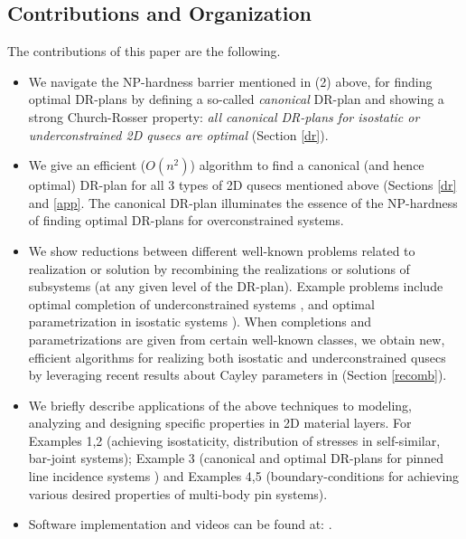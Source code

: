 \subsection{Contributions and Organization}
\label{sec:cont}
The contributions of this paper are the following.
\begin{itemize}
\item
We  navigate the NP-hardness barrier mentioned in (2) above, for finding
optimal DR-plans by defining a
so-called {\it canonical} DR-plan and showing a strong Church-Rosser
property: {\it all canonical DR-plans for isostatic or
underconstrained
2D qusecs are optimal} (Section \ref{dr}).
\item
We give an efficient ($O(n^2)$) algorithm to find a canonical (and hence
optimal) DR-plan for all 3 types of 2D qusecs mentioned above (Sections
\ref{dr} and \ref{app}.
The canonical DR-plan
illuminates the essence of the NP-hardness of finding optimal DR-plans for
overconstrained systems.
\item
We show reductions between different well-known problems related to
realization or solution by
recombining the realizations or solutions of subsystems (at any given level
of the DR-plan). Example problems include optimal completion of
underconstrained  systems  \cite{XX}, and optimal parametrization in
isostatic systems \cite{XX}). When completions and parametrizations are
given from certain well-known classes, we obtain new,
efficient algorithms for realizing both isostatic and underconstrained
qusecs by leveraging recent results about Cayley parameters in
\cite{XX,XX}  (Section \ref{recomb}).
\item
We briefly describe applications of the above techniques to modeling,
analyzing and designing specific properties in 2D material layers.
For Examples 1,2 (achieving isostaticity, distribution of stresses in
self-similar, bar-joint systems); Example 3 (canonical and optimal
DR-plans for pinned line incidence systems \cite{XX}) and Examples 4,5
(boundary-conditions for achieving various desired properties
of multi-body  pin systems).

\item
Software implementation and videos can be found at: .
\end{itemize}
